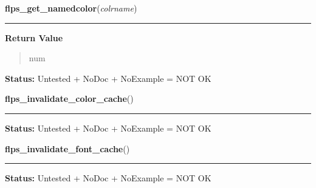     \vspace{0.5ex}

\hspace{.8\funcindent}\begin{boxedminipage}{\funcwidth}

    \raggedright \textbf{flps\_get\_namedcolor}(\textit{colrname})

    \vspace{-1.5ex}

    \rule{\textwidth}{0.5\fboxrule}
\setlength{\parskip}{2ex}
\setlength{\parskip}{1ex}
      \textbf{Return Value}
    \vspace{-1ex}

      \begin{quote}
      num

      \end{quote}

\textbf{Status:} Untested + NoDoc + NoExample = NOT OK



    \end{boxedminipage}

    \label{xformslib:library:flps_invalidate_color_cache}

    \vspace{0.5ex}

\hspace{.8\funcindent}\begin{boxedminipage}{\funcwidth}

    \raggedright \textbf{flps\_invalidate\_color\_cache}()

    \vspace{-1.5ex}

    \rule{\textwidth}{0.5\fboxrule}
\setlength{\parskip}{2ex}
\setlength{\parskip}{1ex}
\textbf{Status:} Untested + NoDoc + NoExample = NOT OK



    \end{boxedminipage}

    \label{xformslib:library:flps_invalidate_font_cache}

    \vspace{0.5ex}

\hspace{.8\funcindent}\begin{boxedminipage}{\funcwidth}

    \raggedright \textbf{flps\_invalidate\_font\_cache}()

    \vspace{-1.5ex}

    \rule{\textwidth}{0.5\fboxrule}
\setlength{\parskip}{2ex}
\setlength{\parskip}{1ex}
\textbf{Status:} Untested + NoDoc + NoExample = NOT OK



    \end{boxedminipage}

